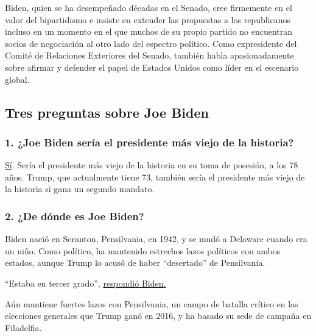 Biden, quien se ha desempeñado décadas en el Senado, cree firmemente en
el valor del bipartidismo e insiste en extender las propuestas a los
republicanos incluso en un momento en el que muchos de su propio partido
no encuentran socios de negociación al otro lado del espectro político.
Como expresidente del Comité de Relaciones Exteriores del Senado,
también habla apasionadamente sobre afirmar y defender el papel de
Estados Unidos como líder en el escenario global.

\hypertarget{tres-preguntas-sobre-joe-biden}{%
\subsection{Tres preguntas sobre Joe
Biden}\label{tres-preguntas-sobre-joe-biden}}

\hypertarget{1-joe-biden-seruxeda-el-presidente-muxe1s-viejo-de-la-historia}{%
\subsubsection{\texorpdfstring{\textbf{1. ¿Joe Biden sería el presidente
más viejo de la
historia?}}{1. ¿Joe Biden sería el presidente más viejo de la historia?}}\label{1-joe-biden-seruxeda-el-presidente-muxe1s-viejo-de-la-historia}}

\href{https://www.nytimes3xbfgragh.onion/2019/07/29/us/politics/joe-biden-age.html}{Sí}.
Sería el presidente más viejo de la historia en su toma de posesión, a
los 78 años. Trump, que actualmente tiene 73, también sería el
presidente más viejo de la historia si gana un segundo mandato.

\hypertarget{2-de-duxf3nde-es-joe-biden}{%
\subsubsection{\texorpdfstring{\textbf{2. ¿De dónde es Joe
Biden?}}{2. ¿De dónde es Joe Biden?}}\label{2-de-duxf3nde-es-joe-biden}}

Biden nació en Scranton, Pensilvania, en 1942, y se mudó a Delaware
cuando era un niño. Como político, ha mantenido estrechos lazos
políticos con ambos estados, aunque Trump lo acusó de haber
``desertado'' de Pensilvania.

``Estaba en tercer grado'',
\href{https://www.nytimes3xbfgragh.onion/2019/05/28/us/politics/trump-biden-north-korea.html}{respondió
Biden}\href{https://www.nytimes3xbfgragh.onion/2019/05/28/us/politics/trump-biden-north-korea.html}{.}

Aún mantiene fuertes lazos con Pensilvania, un campo de batalla crítico
en las elecciones generales que Trump ganó en 2016, y ha basado su sede
de campaña en Filadelfia.

